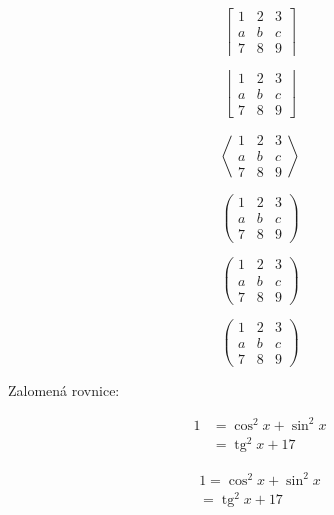 \documentclass[a4paper, 12pt]{article}
\DeclareMathOperator{\tg}{tg}
\begin{document}
$$
    \left \lceil
    \begin{matrix}
        1 & 2 & 3 \\
        a & b & c \\
        7 & 8 & 9
    \end{matrix}
    \right \rceil
$$

$$
    \left \lfloor
    \begin{matrix}
        1 & 2 & 3 \\
        a & b & c \\
        7 & 8 & 9
    \end{matrix}
    \right \rfloor
$$

$$
    \left \langle
    \begin{matrix}
        1 & 2 & 3 \\
        a & b & c \\
        7 & 8 & 9
    \end{matrix}
    \right \rangle
$$

$$
    \left(
    \begin{array}{cc|c} %
            1 & 2 & 3 \\
            a & b & c \\
            \hline
            7 & 8 & 9
        \end{array}
    \right)
$$

$$
    \left(
    \begin{matrix}
            1 & 2 & 3 \\
            a & b & c \\
            7 & 8 & 9
        \end{matrix}
    \right)
$$

$$
    \left(
    \begin{smallmatrix}
            1 & 2 & 3\\
            a & b & c\\
            7 & 8 & 9
        \end{smallmatrix}
    \right)
$$

Zalomená rovnice:

\begin{equation}
    \begin{split}
        1 &=  \cos ^ 2 x + \sin ^2 x \\
        & =  \tg ^2 x + 17
    \end{split}
\end{equation}

\begin{multline}
    1 =  \cos ^ 2 x + \sin ^2 x \\
    =  \tg ^2 x + 17
\end{multline}
\end{document}
